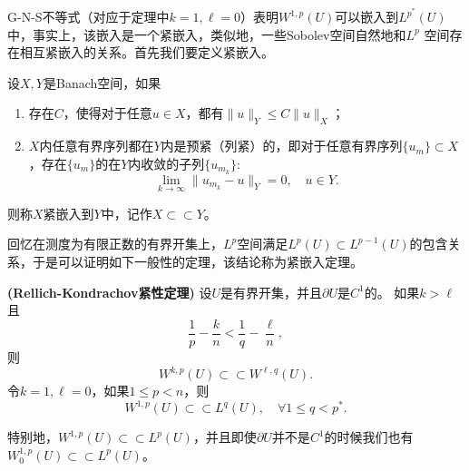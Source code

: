 \documentclass[a4paper,10pt]{ctexart}
\begin{document}
G-N-S不等式（对应于定理中$ k=1,\ell=0 $）表明$ W^{1,p}(U) $可以嵌入到$ L^{p^*}(U) $中，事实上，该嵌入是一个紧嵌入，类似地，一些Sobolev空间自然地和$ L^p $ 空间存在相互紧嵌入的关系。首先我们要定义紧嵌入。
\begin{definition}
    设$ X,Y $是Banach空间，如果
    \begin{enumerate}
        \item 存在$ C $，使得对于任意$ u\in X $，都有$ \| u \|_Y \leqslant C \| u \|_X $；
        \item $ X $内任意有界序列都在$ Y $内是预紧（列紧）的，即对于任意有界序列$ \{ u_m \}\subset X $，存在$ \{ u_m \} $的在$ Y $内收敛的子列$ \{ u_{m_k} \} $:
        \[
            \lim_{k\to\infty} \| u_{m_k} - u \|_Y = 0, \quad u\in Y.
        \]
    \end{enumerate}
    则称$ X $紧嵌入到$ Y $中，记作$ X \subset\subset Y $。
\end{definition}
回忆在测度为有限正数的有界开集上，$ L^p $空间满足$ L^p(U) \subset L^{p-1}(U) $的包含关系，于是可以证明如下一般性的定理，该结论称为紧嵌入定理。
\begin{theorem}{\normalfont\textbf{(Rellich-Kondrachov紧性定理)}}
    设$ U $是有界开集，并且$ \partial U $是$ C^1 $的。
    如果$ k>\ell $且
    \begin{equation}
        \frac{1}{p} - \frac{k}{n} < \frac{1}{q} - \frac{\ell}{n},
    \end{equation}
    则
    \begin{equation}
        W^{k,p}(U) \subset\subset W^{\ell,q}(U).
    \end{equation}
    令$ k=1,\ell=0 $，如果$ 1\leqslant p < n $，则
    \begin{equation}
        W^{1,p}(U) \subset\subset L^q(U),\quad \forall 1\leqslant q < p^*.
    \end{equation}
\end{theorem}
\noindent 特别地，$ W^{1,p}(U)\subset\subset L^p(U) $，并且即使$ \partial U $并不是$ C^1 $的时候我们也有$ W^{1,p}_0(U)\subset\subset L^p(U) $。
\end{document}
